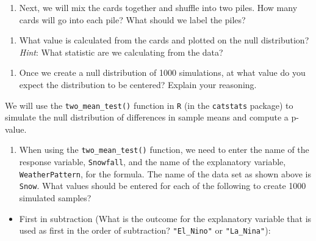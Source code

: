 \documentclass[
]{report}
\providecommand{\tightlist}{%
  \setlength{\itemsep}{0pt}\setlength{\parskip}{0pt}}
\begin{document}
\vspace{0.3in}

\begin{enumerate}
\def\labelenumi{\arabic{enumi}.}
\setcounter{enumi}{11}
\tightlist
\item
  Next, we will mix the cards together and shuffle into two piles. How many cards will go into each pile? What should we label the piles?
\end{enumerate}

\vspace{.8in}

\begin{enumerate}
\def\labelenumi{\arabic{enumi}.}
\setcounter{enumi}{12}
\tightlist
\item
  What value is calculated from the cards and plotted on the null distribution? \emph{Hint}: What statistic are we calculating from the data?
\end{enumerate}

\vspace{0.3in}

\begin{enumerate}
\def\labelenumi{\arabic{enumi}.}
\setcounter{enumi}{13}
\tightlist
\item
  Once we create a null distribution of 1000 simulations, at what value do you expect the distribution to be centered? Explain your reasoning.
\end{enumerate}

\vspace{.8in}

We will use the \texttt{two\_mean\_test()} function in \texttt{R} (in the \texttt{catstats} package) to simulate the null distribution of differences in sample means and compute a p-value.

\newpage

\begin{enumerate}
\def\labelenumi{\arabic{enumi}.}
\setcounter{enumi}{14}
\tightlist
\item
  When using the \texttt{two\_mean\_test()} function, we need to enter the name of the response variable, \texttt{Snowfall}, and the name of the explanatory variable, \texttt{WeatherPattern}, for the formula. The name of the data set as shown above is \texttt{Snow}. What values should be entered for each of the following to create 1000 simulated samples?
\end{enumerate}

\begin{itemize}
\tightlist
\item
  First in subtraction (What is the outcome for the explanatory variable that is used as first in the order of subtraction? \texttt{"El\_Nino"} or \texttt{"La\_Nina"}):
\end{itemize}
\end{document}
